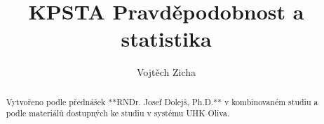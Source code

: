 \documentclass[twoside,12pt]{article}
\title{KPSTA Pravděpodobnost a statistika}
\author{Vojtěch Zicha}
\begin{document}
\maketitle\thispagestyle{mypagestyle}

\begin{abstract}
\begin{markdown}
Vytvořeno podle přednášek **RNDr. Josef Dolejš, Ph.D.** v kombinovaném studiu a podle materiálů dostupných ke studiu v systému UHK Oliva.
\end{markdown}
\end{abstract}

\begin{markdown}

\tableofcontents

\clearpage

\end{markdown}
\end{document}
